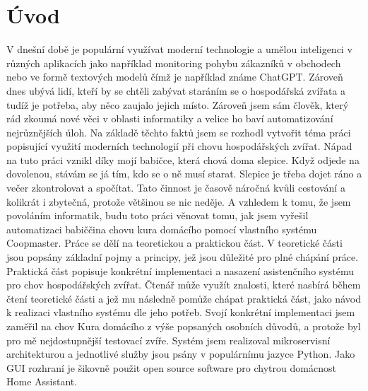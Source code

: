 \chapter{Úvod}
V dnešní době je populární využívat moderní technologie a umělou inteligenci v různých aplikacích jako například monitoring pohybu zákazníků v obchodech nebo ve formě textových modelů čímž je například známe ChatGPT.
Zároveň dnes ubývá lidí, kteří by se chtěli zabývat staráním se o hospodářská zvířata a tudíž je potřeba, aby něco zaujalo jejich místo.
Zároveň jsem sám člověk, který rád zkoumá nové věci v oblasti informatiky a velice ho baví automatizování nejrůznějších úloh.
Na základě těchto faktů jsem se rozhodl vytvořit téma práci popisující využití moderních technologií při chovu hospodářských zvířat.
Nápad na tuto práci vznikl díky mojí babičce, která chová doma slepice.
Když odjede na dovolenou, stávám se já tím, kdo se o ně musí starat.
Slepice je třeba dojet ráno a večer zkontrolovat a spočítat.
Tato činnost je časově náročná kvůli cestování a kolikrát i zbytečná, protože většinou se nic neděje.
A vzhledem k tomu, že jsem povoláním informatik, budu toto práci věnovat tomu, jak jsem vyřešil automatizaci babiččina chovu kura domácího pomocí vlastního systému Coopmaster.
\newline
Práce se dělí na teoretickou a praktickou část.
V teoretické části jsou popsány základní pojmy a principy, jež jsou důležité pro plné chápání práce.
Praktická část popisuje konkrétní implementaci a nasazení asistenčního systému pro chov hospodářských zvířat.
Čtenář může využít znalosti, které nasbírá během čtení teoretické části a jež mu následně pomůže chápat praktická část, jako návod k realizaci vlastního systému dle jeho potřeb.
\newline
Svojí konkrétní implementaci jsem zaměřil na chov Kura domácího z výše popsaných osobních důvodů, a protože byl pro mě nejdostupnější testovací zvíře.
Systém jsem realizoval mikroservisní architekturou a jednotlivé služby jsou psány v populárnímu jazyce Python.
Jako GUI rozhraní je šikovně použit open source software pro chytrou domácnost Home Assistant.
\newline
